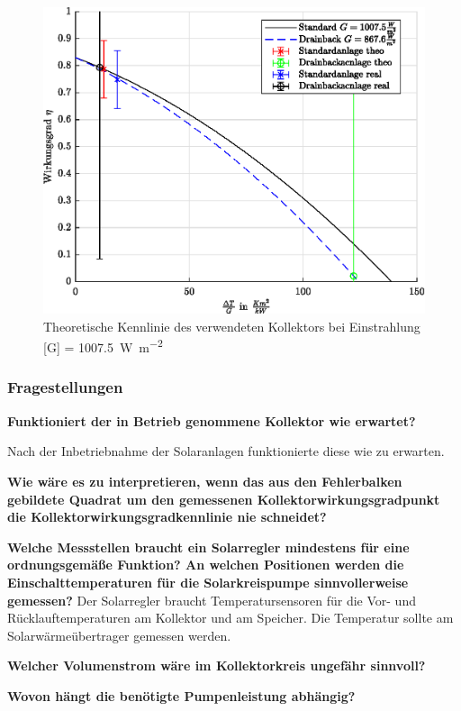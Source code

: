 \begin{figure}[H]
	\centering
	\includegraphics[height=0.3\textheight]{../DATA/KennlinieTheo.eps}
	\caption{Theoretische Kennlinie des verwendeten Kollektors bei Einstrahlung [G] = \SI{1007.5}{\watt\per\meter\squared}}
	\label{fig:KennKoll}
\end{figure}


\subsubsection{Fragestellungen}

\textbf{Funktioniert der in Betrieb genommene Kollektor wie erwartet?}

Nach der Inbetriebnahme der Solaranlagen funktionierte diese wie zu erwarten. 

\textbf{Wie wäre es zu interpretieren, wenn das aus den Fehlerbalken gebildete Quadrat um den gemessenen Kollektorwirkungsgradpunkt die Kollektorwirkungsgradkennlinie nie schneidet?}

\textbf{Welche Messstellen braucht ein Solarregler mindestens für eine ordnungsgemäße
	Funktion? An welchen Positionen werden die Einschalttemperaturen für die Solarkreispumpe
	sinnvollerweise gemessen?}
Der Solarregler braucht Temperatursensoren für die Vor- und Rücklauftemperaturen am Kollektor und am Speicher. Die Temperatur sollte am Solarwärmeübertrager gemessen werden. 

\textbf{Welcher Volumenstrom wäre im Kollektorkreis ungefähr sinnvoll?}

\textbf{Wovon hängt die benötigte Pumpenleistung abhängig?}

